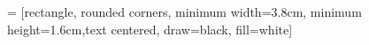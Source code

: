 \usepackage{verbatim}   %
\usepackage{fancyvrb}   %

\usepackage{csquotes}   %
\usepackage{booktabs}   %

\usepackage{ragged2e} %
\usepackage[nottoc]{tocbibind}

\usepackage{blindtext}   %
\usepackage{ifoddpage}




\newcommand{\coloredrulei}[3]{%
  \renewcommand*{\do}[1]{%
    \textcolor{##1}{\rule{#1}{#2}}}
  \begingroup\docsvlist{#3}\endgroup}

\newcommand{\coloredrule}[3]{%
  \setlength{\colortotallength}{#1}
  \renewcommand*{\do}[1]{%
      \stepcounter{colorcounter}}
    \setcounter{colorcounter}{0}
    \docsvlist{#3}
  \setlength{\colorsegmentlength}{%
    \dimexpr \numexpr \colortotallength / \value{colorcounter} \relax sp \relax}
  \coloredrulei{\colorsegmentlength}{#2}{#3}}

 = [rectangle, rounded corners, minimum width=3.8cm, minimum height=1.6cm,text centered, draw=black, fill=white]

\usepackage{siunitx}
